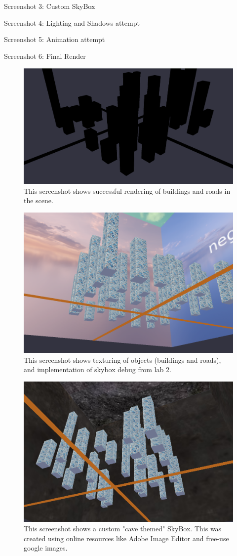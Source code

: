 Screenshot 3: Custom SkyBox

Screenshot 4: Lighting and Shadows attempt

Screenshot 5: Animation attempt

Screenshot 6: Final Render


\newpage

\begin{figure}
    \centering
    \includegraphics[width=0.5\linewidth]{Results//Progress_screenshots/Screenshot 1 - Geometry.png}
    \caption{This screenshot shows successful rendering of buildings and roads in the scene.}
\end{figure}
\begin{figure}
    \centering
    \includegraphics[width=0.5\linewidth]{Results//Progress_screenshots/Screenshot 3a - Skybox.png}
    \caption{This screenshot shows texturing of objects (buildings and roads), and implementation of skybox debug from lab 2.}
\end{figure}
\begin{figure}
    \centering
    \includegraphics[width=0.5\linewidth]{Results//Progress_screenshots/Screenshot 3b - Custom Skybox.png.png}
    \caption{This screenshot shows a custom "cave themed" SkyBox. This was created using online resources like Adobe Image Editor and free-use google images.}
\end{figure}
